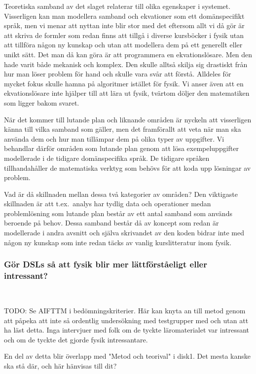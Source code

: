 \begin{draft}
Teoretiska samband av det slaget relaterar till olika egenskaper i systemet.
Visserligen kan man modellera samband och ekvationer som ett domänspecifikt
språk, men vi menar att nyttan inte blir stor med det eftersom allt vi då gör är
att skriva de formler som redan finns att tillgå i diverse kursböcker i fysik
utan att tillföra någon ny kunskap och utan att modellera dem på ett generellt
eller unikt sätt. Det man då kan göra är att programmera en ekvationslösare. Men
den hade varit både mekanisk och komplex. Den skulle alltså skilja sig
drastiskt från hur man löser problem för hand och skulle vara svår att förstå.
Alldeles för mycket fokus skulle hamna på algoritmer istället för fysik. Vi
anser även att en ekvationslösare inte hjälper till att lära ut fysik, tvärtom
döljer den matematiken som ligger bakom svaret.

När det kommer till lutande plan och liknande områden är nyckeln att visserligen
känna till vilka samband som gäller, men det framförallt att veta när man ska
använda dem och hur man tillämpar dem på olika typer av uppgifter. Vi behandlar
därför områden som lutande plan genom att lösa exempeluppgifter modellerade i de
tidigare domänspecifika språk. De tidigare språken tillhandahåller de matematiska
verktyg som behövs för att koda upp lösningar av problem.

Vad är då skillnaden mellan dessa två kategorier av områden?
Den viktigaste skillnaden är att t.ex.~analys har tydlig data och operationer 
medan problemlösning som lutande plan består av ett antal samband som används
beroende på behov. Dessa samband består då av koncept som redan är modellerade i
andra avsnitt och själva skrivandet av den koden bidrar inte med någon ny
kunskap som inte redan täcks av vanlig kurslitteratur inom fysik.

\subsubsection{Gör DSLs så att fysik blir mer lättförståeligt eller
intressant?}~\label{sec:bara_fysik}

TODO: Se AIFTTM i bedömningskriterier. Här kan knyta an till metod genom att
påpeka att inte så ordentlig undersökning med testgrupper med och utan att ha
läst detta. Inga intervjuer med folk om de tyckte läromaterialet var intressant
och om de tyckte det gjorde fysik intressantare.

En del av detta blir överlapp med "Metod och teorival" i disk1. Det mesta kanske
ska stå där, och här hänvisas till dit?


\end{draft}

